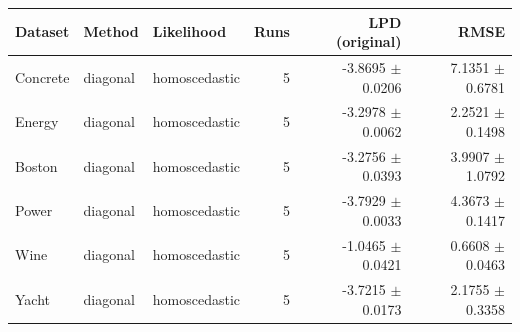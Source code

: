 \begin{tabular}{lllrrr}
\toprule
Dataset & Method & Likelihood & Runs & LPD (original) & RMSE \\
\midrule
Concrete & diagonal & homoscedastic & 5 & -3.8695 $\pm$ 0.0206 & 7.1351 $\pm$ 0.6781 \\
Energy & diagonal & homoscedastic & 5 & -3.2978 $\pm$ 0.0062 & 2.2521 $\pm$ 0.1498 \\
Boston & diagonal & homoscedastic & 5 & -3.2756 $\pm$ 0.0393 & 3.9907 $\pm$ 1.0792 \\
Power & diagonal & homoscedastic & 5 & -3.7929 $\pm$ 0.0033 & 4.3673 $\pm$ 0.1417 \\
Wine & diagonal & homoscedastic & 5 & -1.0465 $\pm$ 0.0421 & 0.6608 $\pm$ 0.0463 \\
Yacht & diagonal & homoscedastic & 5 & -3.7215 $\pm$ 0.0173 & 2.1755 $\pm$ 0.3358 \\
\bottomrule
\end{tabular}
